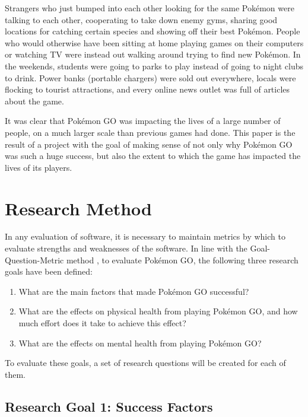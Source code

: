 Strangers who just bumped into each other looking for the same Pokémon were talking to each other, cooperating to take down enemy gyms, sharing good locations for catching certain species and showing off their best Pokémon. People who would otherwise have been sitting at home playing games on their computers or watching TV were instead out walking around trying to find new Pokémon. In the weekends, students were going to parks to play instead of going to night clubs to drink.  Power banks (portable chargers) were sold out everywhere, locals were flocking to tourist attractions, and every online news outlet was full of articles about the game.

It was clear that Pokémon GO was impacting the lives of a large number of people, on a much larger scale than previous games had done. This paper is the result of a project with the goal of making sense of not only why Pokémon GO was such a huge success, but also the extent to which the game has impacted the lives of its players.


\chapter{Research Method}
\label{chapter:research-questions}

In any evaluation of software, it is necessary to maintain metrics by which to evaluate strengths and weaknesses of the software. In line with the Goal-Question-Metric method , to evaluate Pokémon GO, the following three research goals have been defined:

\begin{enumerate}[label=RG{\arabic*}]
	\item What are the main factors that made Pokémon GO successful?
	\item What are the effects on physical health from playing Pokémon GO, and how much effort does it take to achieve this effect?
	\item What are the effects on mental health from playing Pokémon GO?
\end{enumerate}

To evaluate these goals, a set of research questions will be created for each of them.

\section{Research Goal 1: Success Factors}
\label{rg1}

